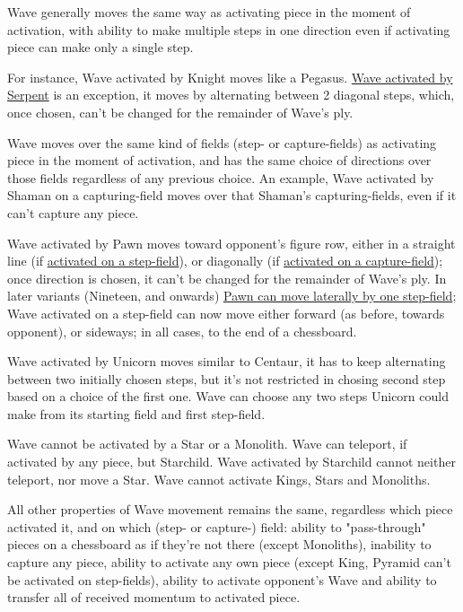 Wave generally moves the same way as activating piece in the moment of activation,
with ability to make multiple steps in one direction even if activating piece can
make only a single step.

For instance, Wave activated by Knight moves like a Pegasus.
\hyperref[fig:scn_tr_15_serpent_activating_wave]{Wave activated by Serpent} is an
exception, it moves by alternating between 2 diagonal steps, which, once chosen,
can't be changed for the remainder of Wave's ply.

Wave moves over the same kind of fields (step- or capture-fields) as activating
piece in the moment of activation, and has the same choice of directions over those
fields regardless of any previous choice. An example, Wave activated by Shaman on a
capturing-field moves over that Shaman's capturing-fields, even if it can't capture
any piece.

Wave activated by Pawn moves toward opponent's figure row, either in a straight line
(if \hyperref[fig:scn_mv_14_wave_activation_by_step_pawn]{activated on a step-field}),
or diagonally (if
\hyperref[fig:scn_mv_16_wave_activation_by_capture_pawn]{activated on a capture-field});
once direction is chosen, it can't be changed for the remainder of Wave's ply.
In later variants (Nineteen, and onwards)
\hyperref[fig:scn_n_15_sideways_pawn_init]{Pawn can move laterally by one step-field};
Wave activated on a step-field can now move either forward (as before, towards opponent),
or sideways; in all cases, to the end of a chessboard.

Wave activated by Unicorn moves similar to Centaur, it has to keep alternating
between two initially chosen steps, but it's not restricted in chosing second step
based on a choice of the first one. Wave can choose any two steps Unicorn could
make from its starting field and first step-field.

Wave cannot be activated by a Star or a Monolith. Wave can teleport, if activated
by any piece, but Starchild. Wave activated by Starchild cannot neither teleport,
nor move a Star. Wave cannot activate Kings, Stars and Monoliths.

All other properties of Wave movement remains the same, regardless which piece
activated it, and on which (step- or capture-) field: ability to "pass-through" pieces
on a chessboard as if they're not there (except Monoliths), inability to capture any
piece, ability to activate any own piece (except King, Pyramid can't be activated on
step-fields), ability to activate opponent's Wave and ability to transfer all of
received momentum to activated piece.

